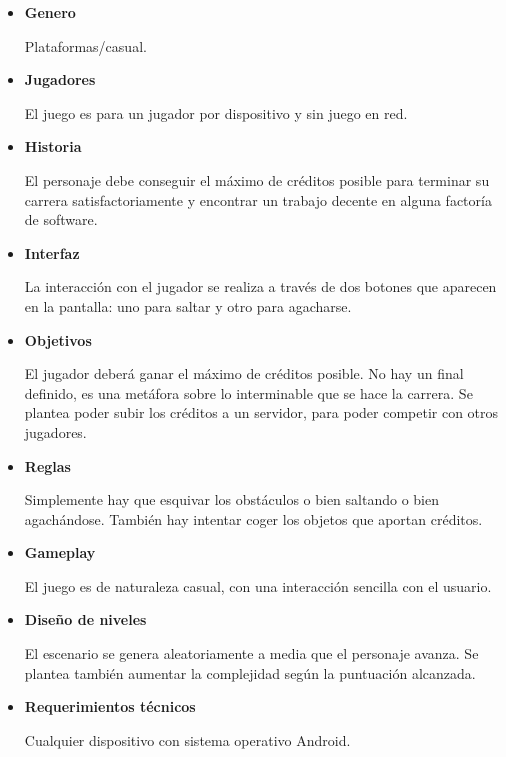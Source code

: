 \documentclass[12 pt, a4paper, twoside]{article}
\begin{document}
\begin{itemize}

  \item {\bf Genero}

    Plataformas/casual.

  \item {\bf Jugadores}

    El juego es para un jugador por dispositivo y sin juego en red.

  \item {\bf Historia}

    El personaje debe conseguir el máximo de créditos posible para terminar su
    carrera satisfactoriamente y encontrar un trabajo decente en alguna
    factoría de software.


  \item {\bf Interfaz}

    La interacción con el jugador se realiza a través de dos botones que
    aparecen en la pantalla: uno para saltar y otro para agacharse.

  \item {\bf Objetivos}

    El jugador deberá ganar el máximo de créditos posible. No hay un final
    definido, es una metáfora sobre lo interminable que se hace la carrera. Se
    plantea poder subir los créditos a un servidor, para poder competir con
    otros jugadores.

  \item {\bf Reglas}

    Simplemente hay que esquivar los obstáculos o bien saltando o bien
    agachándose. También hay intentar coger los objetos que aportan créditos.


  \item {\bf Gameplay}

    El juego es de naturaleza casual, con una interacción sencilla con el
    usuario.

  \item {\bf Diseño de niveles}

    El escenario se genera aleatoriamente a media que el personaje avanza. Se
    plantea también aumentar la complejidad según la puntuación alcanzada.

  \item {\bf Requerimientos técnicos}

    Cualquier dispositivo con sistema operativo Android.

\end{itemize}
\end{document}

